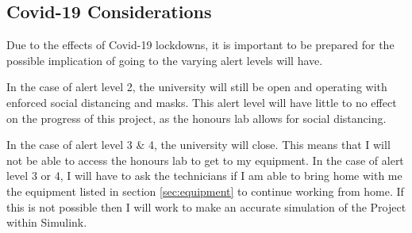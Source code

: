 \documentclass[11pt, a4paper, twoside, openright]{report}
\begin{document}
\subsection{Covid-19 Considerations}

Due to the effects of Covid-19 lockdowns, it is important to be prepared for the possible implication of going to the varying alert levels will have. 

In the case of alert level 2, the university will still be open and operating with enforced social distancing and masks. This alert level will have little to no effect on the progress of this project, as the honours lab allows for social distancing.

In the case of alert level 3 \& 4, the university will close. This means that I will not be able to access the honours lab to get to my equipment. In the case of alert level 3 or 4, I will have to ask the technicians if I am able to bring home with me the equipment listed in section \ref{sec:equipment} to continue working from home. If this is not possible then I will work to make an accurate simulation of the Project within Simulink. 


\backmatter



\end{document}

